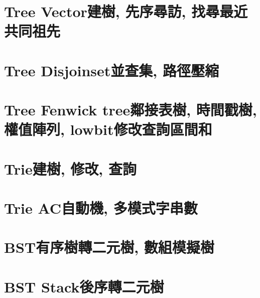 \documentclass{article}
\begin{document}
\footnotesize \tableofcontents  %
\newpage  %
\begin{multicols}{2}

\section{Tree Vector建樹, 先序尋訪, 找尋最近共同祖先}



\section{Tree Disjoinset並查集, 路徑壓縮}



\section{Tree Fenwick tree鄰接表樹, 時間戳樹, 權值陣列, lowbit修改查詢區間和}



\section{Trie建樹, 修改, 查詢}



\section{Trie AC自動機, 多模式字串數}



\section{BST有序樹轉二元樹, 數組模擬樹}



\section{BST Stack後序轉二元樹}


\end{multicols}
\end{document}
